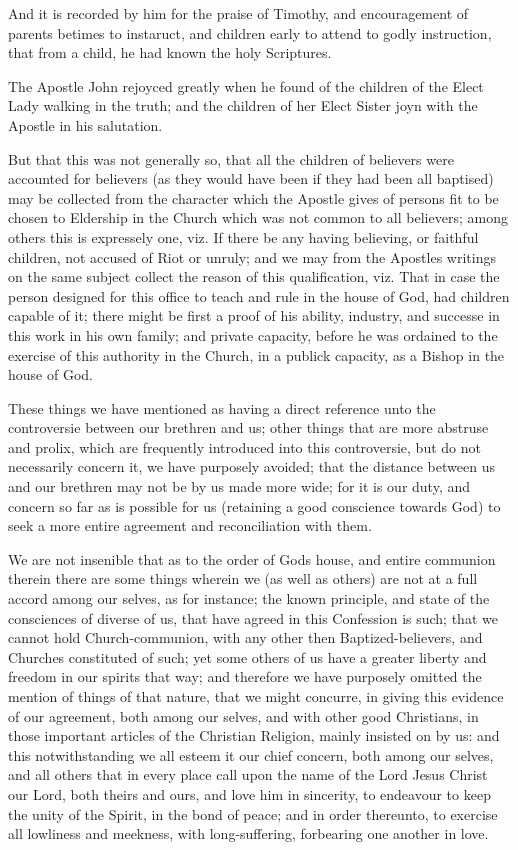 \documentclass[12pt,a4paper]{book}
\begin{document}
And it is recorded by him for the praise of Timothy, and encouragement of parents betimes to instaruct, and children early to attend to godly instruction, that  from a child, he had known the holy Scriptures.

The Apostle John rejoyced greatly when he found of the children of the Elect Lady walking in the truth; and the children of her Elect Sister joyn with the Apostle in his salutation.

But that this was not generally so, that all the children of believers were accounted for believers (as they would have been if they had been all baptised) may be collected from the character which the Apostle gives of persons fit to be chosen to Eldership in the Church which was not common to all believers; among others this is expressely one, viz. If there be any having believing, or faithful children, not accused of Riot or unruly; and we may from the Apostles writings on the same subject collect the reason of this qualification, viz. That in case the person designed for this office to teach and rule in the house of God, had children capable of it; there might be first a proof of his ability, industry, and successe in this work in his own family; and private capacity, before he was ordained to the exercise of this authority in the Church, in a publick capacity, as a Bishop in the house of God.

These things we have mentioned as having a direct reference unto the controversie between our brethren and us; other things that are more abstruse and prolix, which are frequently introduced into this controversie, but do not necessarily concern it, we have purposely avoided; that the distance between us and our brethren may not be by us made more wide; for it is our duty, and concern so far as is possible for us (retaining a good conscience towards God) to seek a more entire agreement and reconciliation with them.

We are not insenible that as to the order of Gods house, and entire communion therein there are some things wherein we (as well as others) are not at a full accord among our selves, as for instance; the known principle, and state of the consciences of diverse of us, that have agreed in this Confession is such; that we cannot hold Church-communion, with any other then Baptized-believers, and Churches constituted of such; yet some others of us have a greater liberty and freedom in our spirits that way; and therefore we have purposely omitted the mention of things of that nature, that we might concurre, in giving this evidence of our agreement, both among our selves, and with other good Christians, in those important articles of the Christian Religion, mainly insisted on by us: and this notwithstanding we all esteem it our chief concern, both among our selves, and all others that in every place call upon the name of the Lord Jesus Christ our Lord, both theirs and ours, and love him in sincerity, to endeavour to keep the unity of the Spirit, in the bond of peace; and in order thereunto, to exercise all lowliness and meekness, with long-suffering, forbearing one another in love.
\end{document}

